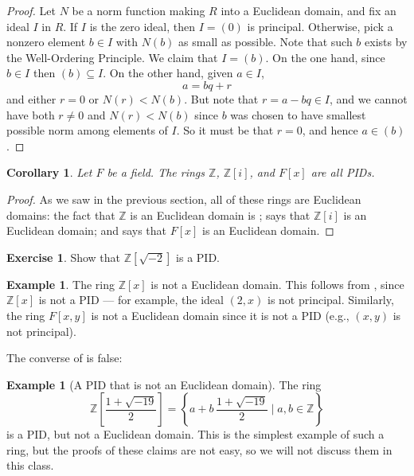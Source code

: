 \documentclass[12pt]{report}
\newtheorem{corollary}[theorem]{Corollary}
\numberwithin{equation}{section}
\numberwithin{theorem}{chapter}
\theoremstyle{definition}
\newtheorem{example}[theorem]{Example}
\newtheorem{exercise}{Exercise}
\newtheorem*{basic properties}{Basic Properties}
\newtheorem*{Important Remark}{Important Remark}
\newcommand{\Z}{\mathbb{Z}}
\begin{document}
\begin{proof} 
Let $N$ be a norm function making $R$ into a Euclidean domain, and fix an ideal $I$ in $R$. If $I$ is the zero ideal, then $I = (0)$ is principal.
 Otherwise, pick a nonzero element $b \in I$ with $N(b)$ as small as possible. Note that such $b$ exists by the Well-Ordering Principle. We claim that $I = (b)$. On the one hand, since $b \in I$ then $(b) \subseteq I$. On the other hand, given $a \in I$,
$$a = bq + r$$
and either $r = 0$ or $N(r) < N(b)$. But note that $r = a - bq \in I$, and we cannot have both $r \neq 0$ and $N(r) < N(b)$ since $b$ was chosen to have smallest possible norm among elements of $I$.
So it must be that $r = 0$, and hence $a \in (b)$.
\end{proof}



\begin{corollary} 
Let $F$ be a field.
The rings $\Z$, $\Z[i]$, and $F[x]$  are all PIDs.
\end{corollary}

\begin{proof}
	As we saw in the previous section, all of these rings are Euclidean domains: the fact that $\Z$ is an Euclidean domain is ;  says that $\Z[i]$ is an Euclidean domain; and  says that $F[x]$ is an Euclidean domain.
\end{proof}


\begin{exercise}
	Show that $\Z[\sqrt{-2}]$ is a PID.
\end{exercise}


\begin{example}
The ring $\Z[x]$ is not a Euclidean domain. This follows from , since $\Z[x]$ is not a PID --- for example, the ideal $(2,x)$ is not principal. Similarly, the ring $F[x,y]$ is not a Euclidean domain since it is not a PID (e.g., $(x,y)$ is not principal). 
\end{example}



The converse of  is false:



\begin{example}[A PID that is not an Euclidean domain]
The ring 
$$\Z\left[ \frac{1 + \sqrt{-19}}{2}\right]=\left\{a+ b \, \frac{1 + \sqrt{-19}}{2} \mid a,b\in \Z\right\}$$ 
is a PID, but not a Euclidean domain. This is the simplest example of such a ring, but the proofs of these claims are not easy, so we will not discuss them in this class.
\end{example}
\end{document}
